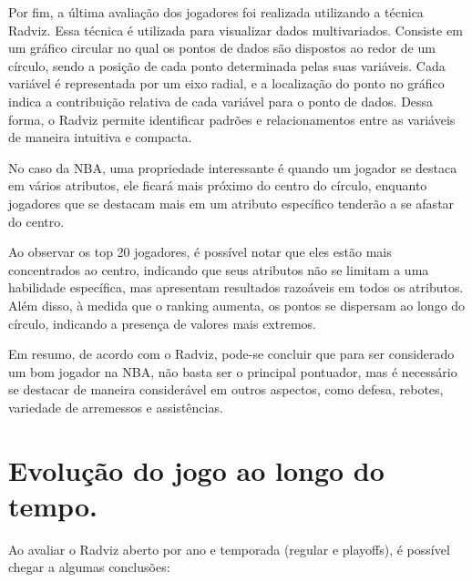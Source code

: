 \documentclass[
]{book}
\begin{document}
Por fim, a última avaliação dos jogadores foi realizada utilizando a técnica Radviz. Essa técnica é utilizada para visualizar dados multivariados. Consiste em um gráfico circular no qual os pontos de dados são dispostos ao redor de um círculo, sendo a posição de cada ponto determinada pelas suas variáveis. Cada variável é representada por um eixo radial, e a localização do ponto no gráfico indica a contribuição relativa de cada variável para o ponto de dados. Dessa forma, o Radviz permite identificar padrões e relacionamentos entre as variáveis de maneira intuitiva e compacta.

No caso da NBA, uma propriedade interessante é quando um jogador se destaca em vários atributos, ele ficará mais próximo do centro do círculo, enquanto jogadores que se destacam mais em um atributo específico tenderão a se afastar do centro.

Ao observar os top 20 jogadores, é possível notar que eles estão mais concentrados ao centro, indicando que seus atributos não se limitam a uma habilidade específica, mas apresentam resultados razoáveis em todos os atributos. Além disso, à medida que o ranking aumenta, os pontos se dispersam ao longo do círculo, indicando a presença de valores mais extremos.

Em resumo, de acordo com o Radviz, pode-se concluir que para ser considerado um bom jogador na NBA, não basta ser o principal pontuador, mas é necessário se destacar de maneira considerável em outros aspectos, como defesa, rebotes, variedade de arremessos e assistências.

\hypertarget{evoluuxe7uxe3o-do-jogo-ao-longo-do-tempo.}{%
\chapter{Evolução do jogo ao longo do tempo.}\label{evoluuxe7uxe3o-do-jogo-ao-longo-do-tempo.}}

Ao avaliar o Radviz aberto por ano e temporada (regular e playoffs), é possível chegar a algumas conclusões:
\end{document}
